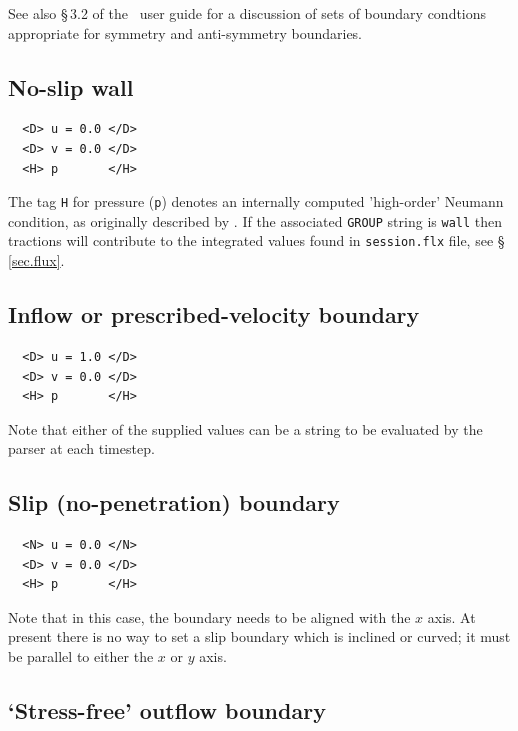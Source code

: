 \documentclass[11pt]{report}
\begin{document}
See also \S\,3.2 of the \Dog\ user guide for a discussion of sets of
boundary condtions appropriate for symmetry and anti-symmetry
boundaries.

\subsection{No-slip wall}

{\small
\begin{verbatim}
  <D> u = 0.0 </D>
  <D> v = 0.0 </D>
  <H> p       </H>
\end{verbatim}
}
\noindent The tag \verb+H+ for pressure (\verb+p+) denotes an
internally computed 'high-order' Neumann condition, as originally
described by \citet{kio91}.  If the associated \verb|GROUP| string is
\verb|wall| then tractions will contribute to the integrated values
found in \verb+session.flx+ file, see \S\,\ref{sec.flux}.

\subsection{Inflow or prescribed-velocity boundary}

{\small
\begin{verbatim}
  <D> u = 1.0 </D>
  <D> v = 0.0 </D>
  <H> p       </H>
\end{verbatim}
}
\noindent Note that either of the supplied values can be a string to
be evaluated by the parser at each timestep.

\subsection{Slip (no-penetration) boundary}

{\small
\begin{verbatim}
  <N> u = 0.0 </N>
  <D> v = 0.0 </D>
  <H> p       </H>
\end{verbatim}
}
\noindent Note that in this case, the boundary needs to be aligned
with the $x$ axis.  At present there is no way to set a slip boundary
which is inclined or curved; it must be parallel to either the $x$ or
$y$ axis.

\subsection{`Stress-free' outflow boundary}
\label{sec.stressfree}
\end{document}
